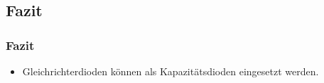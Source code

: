 \subsection{Fazit}
\begin{frame}
\frametitle{Fazit}
  \begin{itemize}
    \item Gleichrichterdioden können als Kapazitätsdioden eingesetzt werden. 
  \end{itemize}
\end{frame}
